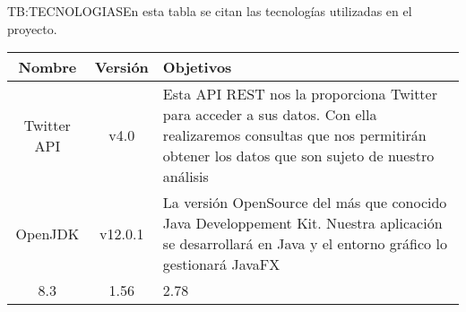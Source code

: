 \begin{table}[Tecnologías utilizadas]{TB:TECNOLOGIAS}{En esta tabla se citan las tecnologías utilizadas en el proyecto.}
  \begin{tabular}{|c|c|p{12cm}|}
    \hline
    \textbf{Nombre} & \textbf{Versión} & \textbf{Objetivos} \\
    \hline \hline
    Twitter API & v4.0 &Esta API REST nos la proporciona Twitter para acceder a sus datos. Con ella realizaremos consultas que nos permitirán obtener los datos que son sujeto de nuestro análisis \\
    OpenJDK& v12.0.1 &La versión OpenSource del más que conocido Java Developpement Kit. Nuestra aplicación se desarrollará en Java y el entorno gráfico lo gestionará JavaFX \\
    8.3 & 1.56 & 2.78 \\
    \hline
  \end{tabular}
\end{table}